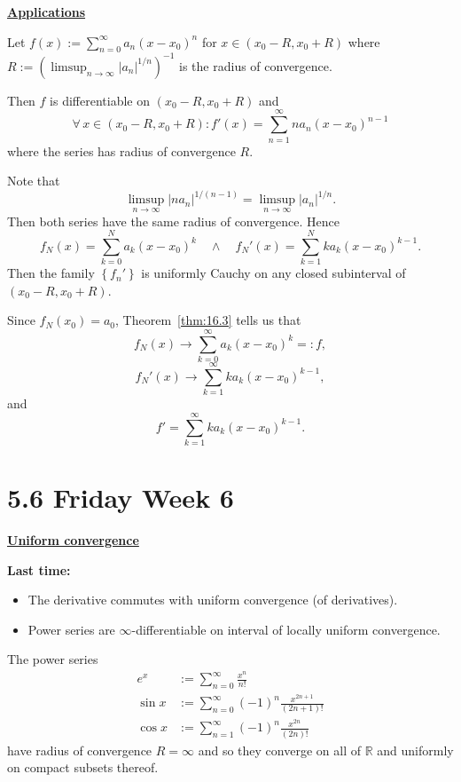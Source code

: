 \documentclass{notes}
\begin{document}
\newpage

{\boldmath \bfseries \underline{Applications}}

\begin{lem}
  Let $f(x) := \sum_{n = 0}^\infty a_n (x - x_0)^n$ for $x \in (x_0 - R, x_0 + R)$ where $R := (\limsup_{n \to \infty} \left | a_n \right |^{1 / n})^{-1}$ is the radius of convergence.
  
  Then $f$ is differentiable on $(x_0 - R, x_0 + R)$ and 
  \[
    \forall \, x \in (x_0 - R, x_0 + R): f'(x) = \sum_{n = 1}^\infty n a_n (x - x_0)^{n - 1}
  \]
  where the series has radius of convergence $R$.
\end{lem}

\begin{prf}
  Note that 
  \[
    \limsup_{n \to \infty} \left | n a_n \right |^{1 / (n - 1)} = \limsup_{n \to \infty} \left | a_n \right |^{1 / n}.
  \]
  Then both series have the same radius of convergence.
  Hence 
  \[
    f_N(x) = \sum_{k = 0}^N a_k (x - x_0)^k \quad \land \quad f_N'(x) = \sum_{k = 1}^N k a_k (x - x_0)^{k - 1}.
  \]
  Then the family $\left \{ f_n' \right \}$ is uniformly Cauchy on any closed subinterval of $(x_0 - R, x_0 + R)$.
  
  Since $f_N(x_0) = a_0$, Theorem~\ref{thm:16.3} tells us that 
  \[
    f_N(x) \to \sum_{k = 0}^\infty a_k (x - x_0)^k =: f, 
  \]
  \[
    f_N'(x) \to \sum_{k = 1}^\infty k a_k (x - x_0)^{k - 1}, 
  \]
  and 
  \[
    f' = \sum_{k = 1}^\infty k a_k (x - x_0)^{k - 1}.
  \]
\end{prf}

\newpage

\section{5.6 Friday Week 6}

{\boldmath \bfseries \underline{Uniform convergence}}

{\boldmath \bfseries Last time:} 
\begin{itemize}
  \item The derivative commutes with uniform convergence (of derivatives).
    
  \item Power series are $\infty$-differentiable on interval of locally uniform convergence.
\end{itemize}

\begin{lem}
  The power series
  \begin{align*}
    e^x &:= \sum_{n = 0}^\infty \frac{x^n}{n!} \\ 
    \sin x &:= \sum_{n = 0}^\infty (-1)^n \frac{x^{2 n + 1}}{(2 n + 1)!} \\ 
    \cos x &:= \sum_{n = 1}^\infty (-1)^n \frac{x^{2 n}}{(2 n)!}
  \end{align*}
  have radius of convergence $R = \infty$ and so they converge on all of $\mathbb R$ and uniformly on compact subsets thereof.
\end{lem}
\end{document}

